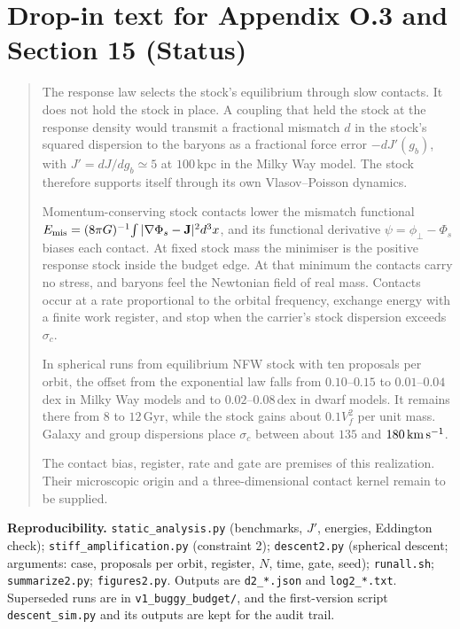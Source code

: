 \section*{Drop-in text for Appendix O.3 and Section 15 (Status)}
\begin{quote}\small
The response law selects the stock's equilibrium through slow contacts. It does not hold the stock in place. A coupling that held the stock at the response density would transmit a fractional mismatch $d$ in the stock's squared dispersion to the baryons as a fractional force error $-dJ'(g_b)$, with $J'=dJ/dg_b\simeq5$ at $100$\,kpc in the Milky Way model. The stock therefore supports itself through its own Vlasov--Poisson dynamics.

Momentum-conserving stock contacts lower the mismatch functional $E_{\rm mis}=(8\pi G)^{-1}\!\int|\nabla\Phi_s-\mathbf J|^2d^3x$, and its functional derivative $\psi=\phi_\perp-\Phi_s$ biases each contact. At fixed stock mass the minimiser is the positive response stock inside the budget edge. At that minimum the contacts carry no stress, and baryons feel the Newtonian field of real mass. Contacts occur at a rate proportional to the orbital frequency, exchange energy with a finite work register, and stop when the carrier's stock dispersion exceeds $\sigma_c$.

In spherical runs from equilibrium NFW stock with ten proposals per orbit, the offset from the exponential law falls from $0.10$--$0.15$ to $0.01$--$0.04$\,dex in Milky Way models and to $0.02$--$0.08$\,dex in dwarf models. It remains there from $8$ to $12$\,Gyr, while the stock gains about $0.1V_f^2$ per unit mass. Galaxy and group dispersions place $\sigma_c$ between about $135$ and $180\,{\rm km\,s^{-1}}$.

The contact bias, register, rate and gate are premises of this realization. Their microscopic origin and a three-dimensional contact kernel remain to be supplied.
\end{quote}

\textbf{Reproducibility.} \texttt{static\_analysis.py} (benchmarks, $J'$, energies, Eddington check); \texttt{stiff\_amplification.py} (constraint 2); \texttt{descent2.py} (spherical descent; arguments: case, proposals per orbit, register, $N$, time, gate, seed); \texttt{runall.sh}; \texttt{summarize2.py}; \texttt{figures2.py}. Outputs are \texttt{d2\_*.json} and \texttt{log2\_*.txt}. Superseded runs are in \texttt{v1\_buggy\_budget/}, and the first-version script \texttt{descent\_sim.py} and its outputs are kept for the audit trail.
